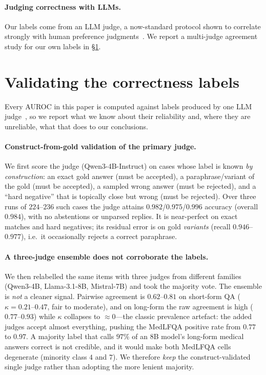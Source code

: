 \documentclass[11pt]{article}
\begin{document}
\paragraph{Judging correctness with LLMs.} Our labels come from an LLM judge, a now-standard
protocol shown to correlate strongly with human preference judgments~\citep{zheng2023judge}.
We report a multi-judge agreement study for our own labels in \S\ref{sec:judge}.

\section{Validating the correctness labels}\label{sec:judge}
Every AUROC in this paper is computed against labels produced by one LLM
judge~\citep{zheng2023judge}, so we report what we know about their reliability and, where they
are unreliable, what that does to our conclusions.

\paragraph{Construct-from-gold validation of the primary judge.} We first score the judge
(Qwen3-4B-Instruct) on cases whose label is known \emph{by construction}: an exact gold answer
(must be accepted), a paraphrase/variant of the gold (must be accepted), a sampled wrong answer
(must be rejected), and a ``hard negative'' that is topically close but wrong (must be
rejected). Over three runs of $224$--$236$ such cases the judge attains
$0.982$/$0.975$/$0.996$ accuracy (overall $0.984$), with no abstentions or unparsed replies. It
is near-perfect on exact matches and hard negatives; its residual error is on gold
\emph{variants} (recall $0.946$--$0.977$), i.e.\ it occasionally rejects a correct paraphrase.

\paragraph{A three-judge ensemble does not corroborate the labels.} We then relabelled the same
items with three judges from different families (Qwen3-4B, Llama-3.1-8B, Mistral-7B) and took
the majority vote. The ensemble is \emph{not} a cleaner signal. Pairwise agreement is
$0.62$--$0.81$ on short-form QA ($\kappa=0.21$--$0.47$, fair to moderate), and on long-form the
raw agreement is high ($0.77$--$0.93$) while $\kappa$ collapses to $\approx0$---the classic
prevalence artefact: the added judges accept almost everything, pushing the MedLFQA positive
rate from $0.77$ to $0.97$. A majority label that calls $97\%$ of an 8B model's long-form
medical answers correct is not credible, and it would make both MedLFQA cells degenerate
(minority class $4$ and $7$). We therefore \emph{keep} the construct-validated single judge
rather than adopting the more lenient majority.
\end{document}
